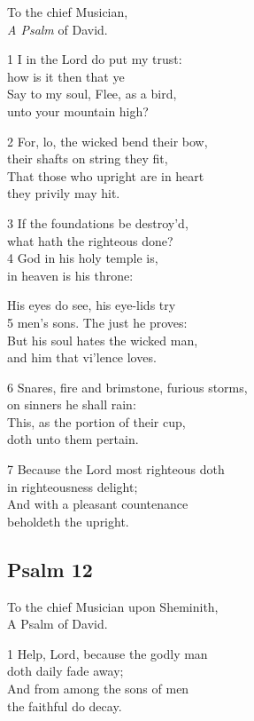 To the chief Musician,\\
\emph{A Psalm} of David.

1 I in the Lord do put my trust:\\
how is it then that ye\\
Say to my soul, Flee, as a bird,\\
unto your mountain high?

2 For, lo, the wicked bend their bow,\\
their shafts on string they fit,\\
That those who upright are in heart\\
they privily may hit.

3 If the foundations be destroy’d,\\
what hath the righteous done?\\
4 God in his holy temple is,\\
in heaven is his throne:

His eyes do see, his eye-lids try\\
5 men’s sons. The just he proves:\\
But his soul hates the wicked man,\\
and him that vi’lence loves.

6 Snares, fire and brimstone, furious storms,\\
on sinners he shall rain:\\
This, as the portion of their cup,\\
doth unto them pertain.

7 Because the Lord most righteous doth\\
in righteousness delight;\\
And with a pleasant countenance\\
beholdeth the upright.


\subsection*{Psalm 12 }

To the chief Musician upon Sheminith,\\
A Psalm of David.

1 Help, Lord, because the godly man\\
doth daily fade away;\\
And from among the sons of men\\
the faithful do decay.

